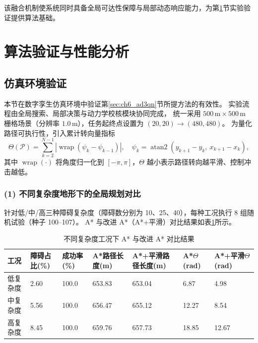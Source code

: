 \documentclass[UTF8,zihao=-4,a4paper,oneside,openany]{ctexrep}
\numberwithin{equation}{chapter}
\renewcommand{\small}{\normalsize}
\renewcommand{\small}{\normalsize}
\theoremstyle{plain}
\theoremstyle{definition}
\begin{document}
该融合机制使系统同时具备全局可达性保障与局部动态响应能力，为第\ref{sec:ch6_validation}节实验验证提供算法基础。

\section{算法验证与性能分析}
\label{sec:ch6_validation}

\subsection{仿真环境验证}
\label{subsec:ch6_sim_validation}

本节在数字孪生仿真环境中验证第\ref{sec:ch6_ad3qn}节所提方法的有效性。
实验流程由全局搜索、局部决策与动力学校核模块协同完成，
统一采用 $500\,\mathrm{m}\times 500\,\mathrm{m}$ 栅格场景（分辨率 $1.0\,\mathrm{m}$），任务起终点设置为 $(20,20)\rightarrow(480,480)$。
为量化路径可执行性，引入累计转向量指标
\begin{equation}
\Theta(\mathcal{P})=\sum_{k=2}^{N-1}\left|\operatorname{wrap}\left(\psi_k-\psi_{k-1}\right)\right|,\quad
\psi_k=\operatorname{atan2}(y_{k+1}-y_k,\ x_{k+1}-x_k),
\label{eq:ch6_turn_metric}
\end{equation}
其中 $\operatorname{wrap}(\cdot)$ 将角度归一化到 $[-\pi,\pi]$，$\Theta$ 越小表示路径转向越平滑、控制冲击越低。

\subsubsection*{(1) 不同复杂度地形下的全局规划对比}

针对低/中/高三种障碍复杂度（障碍数分别为 10、25、40），每种工况执行 8 组随机试验（种子 100--107）。
A* 与改进 A*（A*+平滑）对比结果如表\ref{tab:ch6_complexity_compare}所示。

\begin{table}[H]
\centering
\small
\caption{不同复杂度工况下 A* 与改进 A* 对比结果}
\label{tab:ch6_complexity_compare}
\setlength{\tabcolsep}{3pt}
\begin{tabular}{p{}p{}p{}p{}p{}p{}p{}}
\toprule
工况 & 障碍占比(\%) & 成功率(\%) & A*路径长度(m) & A*+平滑路径长度(m) & A*$\Theta$(rad) & A*+平滑$\Theta$(rad) \\
\midrule
低复杂度 & 2.60 & 100.0 & 653.83 & 653.04 & 6.87 & 4.98 \\
中复杂度 & 5.56 & 100.0 & 656.47 & 655.12 & 12.27 & 8.54 \\
高复杂度 & 8.45 & 100.0 & 659.76 & 657.73 & 18.85 & 12.67 \\
\bottomrule
\end{tabular}
\end{table}
\end{document}
